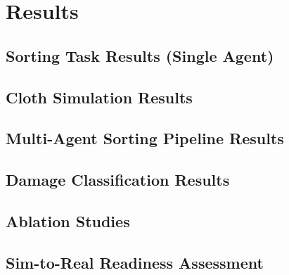 \chapter{Results}\label{ch:results}

\section{Sorting Task Results (Single Agent)}

\section{Cloth Simulation Results}

\section{Multi-Agent Sorting Pipeline Results}

\section{Damage Classification Results}

\section{Ablation Studies}

\section{Sim-to-Real Readiness Assessment}
